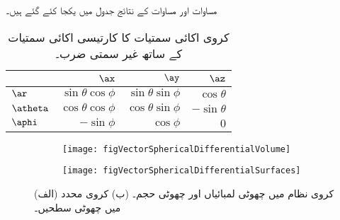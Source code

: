 مساوات   اور مساوات   کے نتائج جدول  میں یکجا کئے گئے ہیں۔ 
\begin{table}
\caption{کروی  اکائی سمتیات کا کارتیسی اکائی سمتیات کے ساتھ غیر سمتی ضرب۔}
\centering
\begin{tabular}{l | r r r}
 & $\ax$ & $\ay$ & $\az$ \\
\hline
$\ar$ & $\sin \theta \cos \phi$ & $\sin \theta \sin \phi$& $\cos \theta$\\
$\atheta$ &$\cos \theta \cos \phi$ &$ \cos \theta \sin \phi$ &$ -\sin \theta$\\
$\aphi$ & $-\sin \phi$ &$ \cos \phi$ &$0$
\end{tabular}
\label{جدول_سمتیہ_کروی_کارتیسی_اکائی_غیر-سمتی_ضرب}
\end{table}
%
\begin{figure}
\centering
\begin{subfigure}{0.4\textwidth}
\centering
\texttt{[image: figVectorSphericalDifferentialVolume]}
\end{subfigure}%
%
\begin{subfigure}{0.4\textwidth}
\centering
\texttt{[image: figVectorSphericalDifferentialSurfaces]}
\end{subfigure}%
\caption{(الف) کروی نظام میں  چھوٹی لمبائیاں اور چھوٹی حجم۔ (ب) کروی محدد میں چھوٹی سطحیں۔}
\label{شکل_سمتیہ_کروی_چھوٹی_حجم}
\end{figure}

